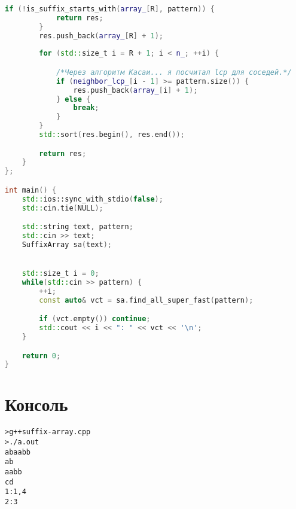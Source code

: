 \begin{lstlisting}[language=C++]
        if (!is_suffix_starts_with(array_[R], pattern)) {
            return res;
        }
        res.push_back(array_[R] + 1);
        
        for (std::size_t i = R + 1; i < n_; ++i) {

            /*Через алгоритм Касаи... я посчитал lcp для соседей.*/
            if (neighbor_lcp_[i - 1] >= pattern.size()) {
                res.push_back(array_[i] + 1);
            } else {
                break;
            }
        }
        std::sort(res.begin(), res.end());

        return res;
    } 
};

int main() {
    std::ios::sync_with_stdio(false);
    std::cin.tie(NULL);

    std::string text, pattern;
    std::cin >> text;
    SuffixArray sa(text);


    std::size_t i = 0;
    while(std::cin >> pattern) {
        ++i;
        const auto& vct = sa.find_all_super_fast(pattern);

        if (vct.empty()) continue;
        std::cout << i << ": " << vct << '\n';
    }

    return 0;
}
\end{lstlisting}

\pagebreak

\section{Консоль}
\begin{alltt}
> g++ suffix-array.cpp
> ./a.out
abaabb
ab
aabb
cd
1: 1, 4
2: 3
\end{alltt}
\pagebreak

